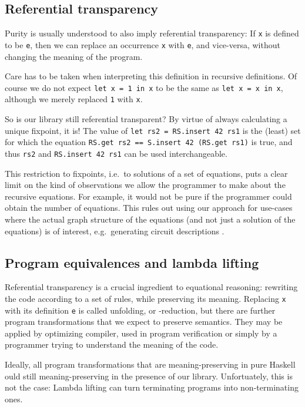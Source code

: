 \documentclass[manuscript,anonymous,screen,acmsmall]{acmart}
\begin{document}
\subsection{Referential transparency}

Purity is usually understood to also imply referential transparency: If \verb|x| is defined to be \verb|e|, then we can replace an occurrence \verb|x| with \verb|e|, and vice-versa, without changing the meaning of the program.

Care has to be taken when interpreting this definition in recursive definitions. Of course we do not expect \verb|let x = 1 in x| to be the same as \verb|let x = x in x|, although we merely replaced \verb|1| with \verb|x|.

So is our library still referential transparent? By virtue of always calculating a unique fixpoint, it is!  The value of \verb|let rs2 = RS.insert 42 rs1| is the (least) set for which the equation \verb|RS.get rs2 == S.insert 42 (RS.get rs1)| is true, and thus \verb|rs2| and \verb|RS.insert 42 rs1| can be used interchangeable.

This restriction to fixpoints, i.e.\ to solutions of a set of equations, puts a clear limit on the kind of observations we allow the programmer to make about the recursive equations. For example, it would not be pure if the programmer could obtain the number of equations. This rules out using our approach for use-cases where the actual graph structure of the equations (and not just a solution of the equations) is of interest, e.g.\ generating circuit descriptions \cite{observable-sharing}.

\subsection{Program equivalences and lambda lifting}\label{sec:sat}

Referential transparency is a crucial ingredient to equational reasoning: rewriting the code according to a set of rules, while preserving its meaning. Replacing \verb|x| with its definition \verb|e| is called unfolding, or \textdelta-reduction, but there are further program transformations that we expect to preserve semantics. They may be applied by optimizing compiler, used in program verification or simply by a programmer trying to understand the meaning of the code.

Ideally, all program transformations that are meaning-preserving in pure Haskell ould still meaning-preserving in the presence of our library. Unfortuately, this is not the case: Lambda lifting can turn terminating programs into non-terminating ones.
\end{document}
